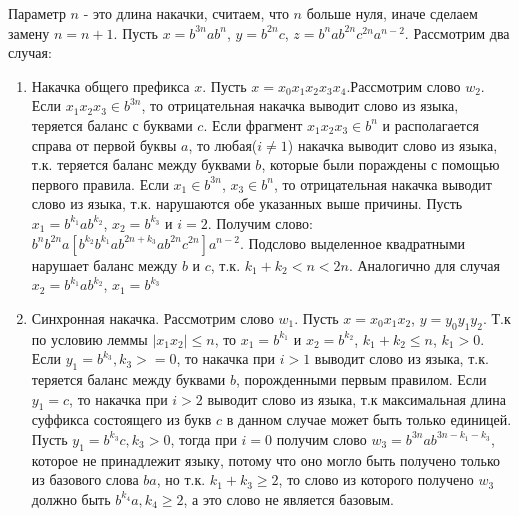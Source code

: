 \documentclass[a4paper, 14pt]{article}
\begin{document}

Параметр $n$ - это длина накачки, считаем, что $n$ больше нуля, иначе сделаем замену $n = n + 1$. Пусть $x = b^{3n} a b^n$, $y = b^{2n} c$, $z = b^{n} a b^{2n} c^{2n} a^{n-2}$. Рассмотрим два случая:

\begin{enumerate}
  \item{Накачка общего префикса $x$. Пусть $x = x_0 x_1 x_2 x_3 x_4$.Рассмотрим слово $w_2$. Если $x_1 x_2 x_3 \in b^{3n}$, то отрицательная накачка выводит слово из языка, теряется баланс с буквами $c$. Если фрагмент $x_1 x_2 x_3 \in b^{n}$ и располагается справа от первой буквы $a$, то любая($i \ne 1$) накачка выводит слово из языка}, т.к. теряется баланс между буквами $b$, которые были пораждены с помощью первого правила. Если $x_1 \in b^{3n}$, $x_3 \in b^{n}$, то отрицательная накачка выводит слово из языка, т.к. нарушаются обе указанных выше причины. Пусть $x_1 = b^{k_1} a b^{k_2}$, $x_2 = b^{k_3}$ и $i = 2$. Получим слово: $b^{n} b^{2n} a [b^{k_2} b^{k_1} a b^{2n + k_3} a b^{2n} c^{2n}] a^{n-2}$. Подслово выделенное квадратными нарушает баланс между $b$ и $c$, т.к. $k_1 + k_2 < n < 2n$. Аналогично для случая  $x_2 = b^{k_1} a b^{k_2}$, $x_1 = b^{k_3}$ 

  \item{Синхронная накачка. Рассмотрим слово $w_1$. Пусть $x = x_0 x_1 x_2$, $y = y_0 y_1 y_2$. Т.к по условию леммы $|x_1 x_2| \leq n$, то $x_1 = b^{k_1}$ и $x_2 = b^{k_2}$, $k_1 + k_2 \leq n$, $k_1 > 0$}. Если $y_1 = b^{k_3}, k_3 >= 0$, то накачка при $i > 1$ выводит слово из языка, т.к. теряется баланс между буквами $b$, порожденными первым правилом. Если $y_1 = c$, то накачка при $i > 2$ выводит слово из языка, т.к максимальная длина суффикса состоящего из букв $c$ в данном случае может быть только единицей.
    Пусть $y_1 = b^{k_3}c, k_3 > 0$, тогда при $i = 0$ получим слово $w_3 = b^{3n}ab^{3n - k_1 - k_3}$, которое не принадлежит языку, потому что оно могло быть получено только из базового слова $ba$, но т.к. $k_1 + k_3 \geq 2$, то слово из которого получено $w_3$ должно быть $b^{k_4}a, k_4 \geq 2$, а это слово не является базовым. 
\end{enumerate}
\end{document}
